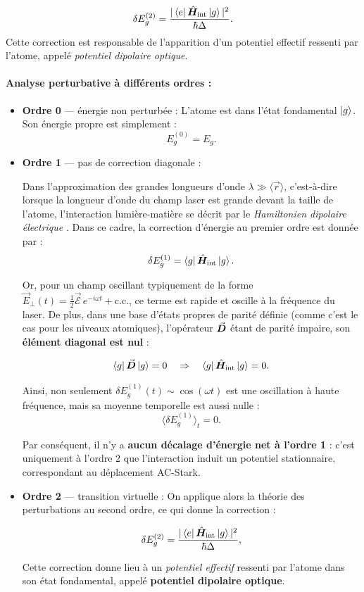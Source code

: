 \begin{equation}
\delta E_g^{(2)} =  \frac{|\bra{e} \hat{\bm{H}}_{\text{int}} \ket{g}|^2}{\hbar \Delta}.
\end{equation}
Cette correction est responsable de l’apparition d’un potentiel effectif ressenti par l’atome, appelé \emph{potentiel dipolaire optique}.


\bigskip

\paragraph{Analyse perturbative à différents ordres :}

\begin{itemize}[label = $\bullet$] 
\item \textbf{Ordre 0} — énergie non perturbée :  
L’atome est dans l’état fondamental \( \ket{g} \). Son énergie propre est simplement :  
\[
E_g^{(0)} = E_g.
\]

\item \textbf{Ordre 1} — pas de correction diagonale :  

Dans l’approximation des grandes longueurs d’onde \( \lambda \gg \langle \vec{r} \rangle \), c’est-à-dire lorsque la longueur d’onde du champ laser est grande devant la taille de l’atome, l’interaction lumière-matière se décrit par le \emph{Hamiltonien dipolaire électrique} . Dans ce cadre, la correction d’énergie au premier ordre est donnée par :
\[
\delta E_g^{(1)} = \bra{g} \hat{\bm{H}}_{\text{int}} \ket{g}.
\]

Or, pour un champ oscillant typiquement de la forme \( \vec{E}_{\perp}(t) = \frac{1}{2} \vec{\mathcal{E}}\, e^{-i\omega t} + \text{c.c.} \), ce terme est rapide et oscille à la fréquence du laser. De plus, dans une base d’états propres de parité définie (comme c’est le cas pour les niveaux atomiques), l’opérateur \( \vec{{\bm{D}}} \) étant de parité impaire, son \textbf{élément diagonal est nul} :

\[
\bra{g}  \vec{{\bm{D}}} \ket{g} = 0 \quad \Rightarrow \quad \bra{g} \hat{\bm{H}}_{\text{int}} \ket{g} = 0.
\]

Ainsi, non seulement \( \delta E_g^{(1)}(t) \sim \cos(\omega t) \) est une oscillation à haute fréquence, mais sa moyenne temporelle est aussi nulle :
\[
\langle \delta E_g^{(1)} \rangle_t = 0.
\]

Par conséquent, il n’y a \textbf{aucun décalage d’énergie net à l’ordre 1} : c’est uniquement à l’ordre 2 que l’interaction induit un potentiel stationnaire, correspondant au déplacement AC-Stark.


\item \textbf{Ordre 2} — transition virtuelle :  
On applique alors la théorie des perturbations au second ordre, ce qui donne la correction :

\begin{equation}
\delta E_g^{(2)} =  \frac{|\bra{e} \hat{\bm{H}}_{\text{int}} \ket{g}|^2}{\hbar \Delta},
\end{equation}

Cette correction donne lieu à un \emph{potentiel effectif} ressenti par l’atome dans son état fondamental, appelé \textbf{potentiel dipolaire optique}.
\end{itemize}

